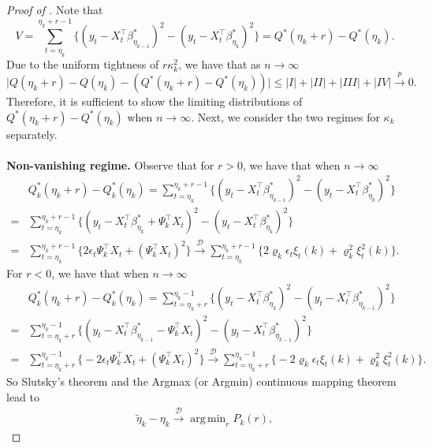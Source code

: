 \documentclass[11pt]{article}
\DeclareMathOperator*{\argmin}{arg\,min}
\theoremstyle{plain}
\theoremstyle{definition}
\begin{document}
\begin{proof}[Proof of ]
Note that $$V = \sum_{t = \eta_k}^{\eta_k + r - 1} \big\{(y_t - X_t^{\top}\beta^*_{\eta_{k-1}})^2 - (y_t - X_t^{\top}\beta^*_{\eta_{k}})^2\big\} = Q^*(\eta_k + r) - Q^*(\eta_k).$$
Due to the uniform tightness of $r\kappa_k^2$, we have that as $n \to \infty$
$$\big|Q(\eta_k + r) - Q(\eta_k) - (Q^*(\eta_k + r) - Q^*(\eta_k))\big| \leq |I| + |II| + |III| + |IV| \overset{p}{\to} 0.$$
Therefore, it is sufficient to show the limiting distributions of $Q^*(\eta_k + r) - Q^*(\eta_k)$ when $n \to \infty$.  Next, we consider the two regimes for $\kappa_k$ separately.
\\
\\
\textbf{Non-vanishing regime.}
Observe that for $r > 0$, we have that when $n \to \infty$
\begin{align*}
    &Q_k^*(\eta_k+ r) - Q_k^*(\eta_k) = \sum_{t = \eta_k}^{\eta_k + r - 1} \big\{(y_t - X_t^{\top}\beta_{\eta_{k-1}}^*)^2 - (y_t - X_t^{\top}\beta_{\eta_{k}}^*)^2\big\}\\
    =& \sum_{t = \eta_k}^{\eta_k + r - 1}\big\{(y_t - X_t^{\top}\beta_{\eta_{k}}^* + \Psi_k^{\top}X_t)^2 - (y_t - X_t^{\top}\beta_{\eta_{k}}^*)^2\big\}\\
    =& \sum_{t = \eta_k}^{\eta_k + r - 1}\big\{2\epsilon_t\Psi_k^{\top}X_t +  (\Psi_k^{\top}X_t)^2\big\} \overset{\mathcal{D}}{\to} \sum_{t = \eta_k}^{\eta_k + r - 1}\big\{2\varrho_k\epsilon_t\xi_t(k) +  \varrho_k^2\xi_t^2(k)\big\}.
\end{align*}
For $r < 0$, we have that  when $n \to \infty$
\begin{align*}
    & Q_k^*(\eta_k+ r) - Q_k^*(\eta_k) = \sum_{t = \eta_k + r}^{\eta_k - 1} \big\{(y_t - X_t^{\top}\beta_{\eta_{k}}^*)^2 - (y_t - X_t^{\top}\beta_{\eta_{k-1}}^*)^2\big\} \\
    = & \sum_{t = \eta_k + r}^{\eta_k - 1} \{(y_t - X_t^{\top}\beta_{\eta_{k-1}}^* - \Psi_k^{\top}X_t)^2 - (y_t - X_t^{\top}\beta_{\eta_{k-1}}^*)^2\} \\ 
    = & \sum_{t = \eta_k + r}^{\eta_k-1} \big\{-2\epsilon_t\Psi_k^{\top}X_t +  (\Psi_k^{\top}X_t)^2\big\} \overset{\mathcal{D}}{\to} \sum_{t = \eta_k + r}^{\eta_k-1}\big\{-2\varrho_k\epsilon_t\xi_t(k) +  \varrho_k^2\xi_t^2(k)\big\}.
\end{align*}
So Slutsky's theorem and the Argmax (or Argmin) continuous mapping theorem \cite[see 3.2.2 Theorem][]{Vaart1996weak} lead to
    \begin{align*}
       \widetilde{\eta}_k - \eta_k
       \overset{\mathcal{D}}{\longrightarrow} \argmin_rP_k(r),
    \end{align*}

\end{proof}
\end{document}
